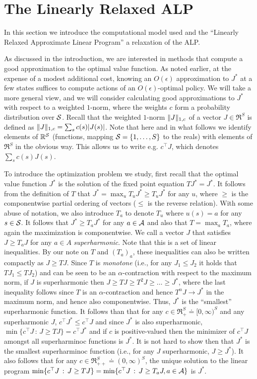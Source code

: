 \documentclass[twocolumn]{IEEEtran}
\begin{document}
\section{The Linearly Relaxed ALP}\label{sec:grlp}
In this section we introduce the computational model used and the ``Linearly Relaxed Approximate Linear Program''
a relaxation of the ALP.

As discussed in the introduction, we are interested in methods that compute a good approximation to the optimal value function.
As noted earlier, at the expense of a modest additional cost, knowing an $O(\epsilon)$ approximation to $J^*$ at a few states suffices to compute actions of an $O(\epsilon)$-optimal policy. We will take a more general view, and we will consider calculating good approximations to $J^*$ with respect to a weighted $1$-norm, where the weights $c$ form a probability distribution over $\S$. Recall that the weighted $1$-norm $\norm{J}_{1,c}$ of a vector $J\in \Re^S$ is defined as $\norm{J}_{1,c}  = \sum_s c(s) |J(s)|$. Note that here and in what follows we identify elements of $\Re^\S$ (functions, mapping $\S = \{1,\dots,S\}$ to the reals) with elements of $\Re^S$ in the obvious way. This allows us to write e.g. $c^\top J$, which denotes $\sum_s c(s) J(s)$.

To introduce the optimization problem we study, first recall that
the optimal value function $J^*$ is the solution of the fixed point equation $TJ^* = J^*$.
It follows from the definition of $T$ that $J^* = \max_u T_u J^* \ge T_u J^*$ for any $u$,
where $\ge$ is the componentwise partial ordering of vectors ($\le$ is the reverse relation).
With some abuse of notation, we also introduce $T_a$ to denote $T_u$ where $u(s) = a$ for any $s\in \S$.
It follows that $J^* \ge T_a J^*$ for any $a\in \A$ and also that $T = \max_a T_a$, where again the maximization is componentwise.
We call a vector $J$ that satisfies $J \ge T_a J$ for any $a\in A$ \emph{superharmonic}. Note that this is a set of linear inequalities.
By our note on $T$ and $(T_a)_a$, these inequalities can also be written compactly as $J \ge T J$.
Since $T$ is \emph{monotone} (i.e., for any $J_1\le J_2$ it holds that $TJ_1 \le T J_2$) and can be seen to be an $\alpha$-contraction with respect to the maximum norm, if $J$ is superharmonic then $J \ge T J \ge T^2 J \ge \dots \ge J^*$, where the last inequality follows since $T$ is an $\alpha$-contraction and hence $T^n J \to J^*$ in the maximum norm, and hence also componentwise.
Thus, $J^*$ is the ``smallest'' superharmonic function. It follows than that
for any $c\in \Re_+^S \doteq [0,\infty)^S$ and any superharmonic $J$, $c^\top J^*\le c^\top J$ and since $J^*$ is also superharmonic, $\min \{ c^\top J\,:\, J \ge T J \} = c^\top J^*$ and if $c$ is positive-valued then the minimizer of $c^\top J$ amongst all superharminoc functions is $J^*$.
\fi
It is not hard to show then that $J^*$ is the smallest superharminoc function (i.e., for any $J$ superharmonic, $J\ge J^*$). It also follows that for any  $c\in \Re_{++}^S \doteq (0,\infty)^S$, the unique solution to the linear program $\min\{ c^\top J \,:\, J \ge T J \} =\min \{ c^\top J\,:\, J \ge T_a J, a\in \A \} $ is $J^*$.
\end{document}

